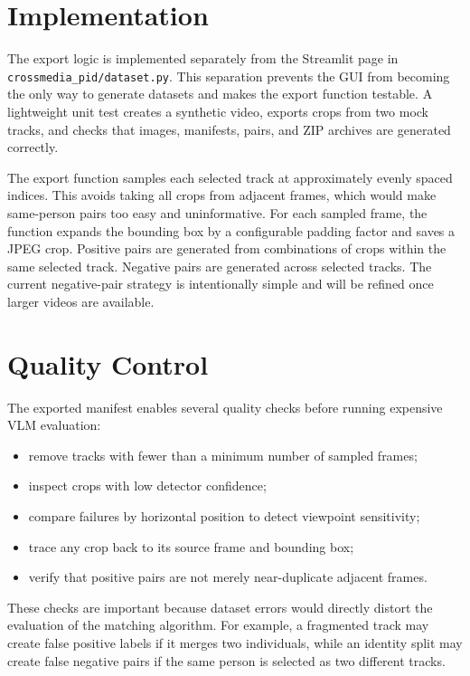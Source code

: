 \section{Implementation}

The export logic is implemented separately from the Streamlit page in \texttt{crossmedia\_pid/dataset.py}. This separation prevents the GUI from becoming the only way to generate datasets and makes the export function testable. A lightweight unit test creates a synthetic video, exports crops from two mock tracks, and checks that images, manifests, pairs, and ZIP archives are generated correctly.

The export function samples each selected track at approximately evenly spaced indices. This avoids taking all crops from adjacent frames, which would make same-person pairs too easy and uninformative. For each sampled frame, the function expands the bounding box by a configurable padding factor and saves a JPEG crop. Positive pairs are generated from combinations of crops within the same selected track. Negative pairs are generated across selected tracks. The current negative-pair strategy is intentionally simple and will be refined once larger videos are available.

\section{Quality Control}

The exported manifest enables several quality checks before running expensive VLM evaluation:

\begin{itemize}
  \item remove tracks with fewer than a minimum number of sampled frames;
  \item inspect crops with low detector confidence;
  \item compare failures by horizontal position to detect viewpoint sensitivity;
  \item trace any crop back to its source frame and bounding box;
  \item verify that positive pairs are not merely near-duplicate adjacent frames.
\end{itemize}

These checks are important because dataset errors would directly distort the evaluation of the matching algorithm. For example, a fragmented track may create false positive labels if it merges two individuals, while an identity split may create false negative pairs if the same person is selected as two different tracks.

